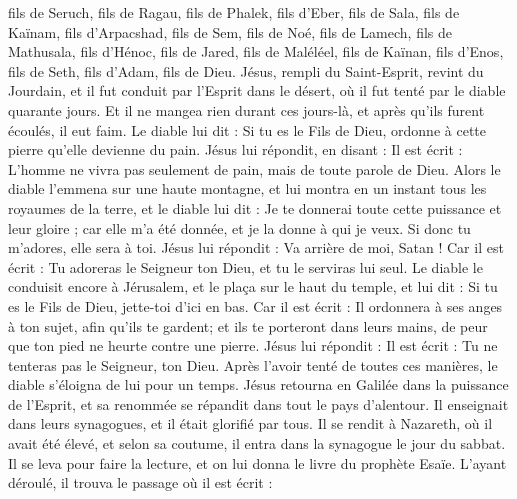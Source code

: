 \begin{multicols}{2}
fils de Seruch, fils de Ragau, fils de Phalek, fils d'Eber, fils de Sala,
fils de Kaïnam, fils d’Arpacshad, fils de Sem, fils de Noé, fils de Lamech,
fils de Mathusala, fils d'Hénoc, fils de Jared, fils de Maléléel, fils de Kaïnan,
fils d'Enos, fils de Seth, fils d'Adam, fils de Dieu.
\VerseOne{}Jésus, rempli du Saint-Esprit, revint du Jourdain, et il fut conduit par l'Esprit dans le désert,
où il fut tenté par le diable quarante jours. Et il ne mangea rien durant ces jours-là, et après qu'ils furent écoulés, il eut faim.
Le diable lui dit : Si tu es le Fils de Dieu, ordonne à cette pierre qu'elle devienne du pain.
Jésus lui répondit, en disant : Il est écrit : L’homme ne vivra pas seulement de pain, mais de toute parole de Dieu.
Alors le diable l'emmena sur une haute montagne, et lui montra en un instant tous les royaumes de la terre,
et le diable lui dit : Je te donnerai toute cette puissance et leur gloire ; car elle m'a été donnée, et je la donne à qui je veux.
Si donc tu m’adores, elle sera à toi.
Jésus lui répondit : Va arrière de moi, Satan ! Car il est écrit : Tu adoreras le Seigneur ton Dieu, et tu le serviras lui seul.
Le diable le conduisit encore à Jérusalem, et le plaça sur le haut du temple, et lui dit : Si tu es le Fils de Dieu, jette-toi d'ici en bas.
Car il est écrit : Il ordonnera à ses anges à ton sujet, afin qu’ils te gardent;
et ils te porteront dans leurs mains, de peur que ton pied ne heurte contre une pierre.
Jésus lui répondit : Il est écrit : Tu ne tenteras pas le Seigneur, ton Dieu.
Après l’avoir tenté de toutes ces manières, le diable s’éloigna de lui pour un temps.
Jésus retourna en Galilée dans la puissance de l'Esprit, et sa renommée se répandit dans tout le pays d'alentour.
Il enseignait dans leurs synagogues, et il était glorifié par tous.
Il se rendit à Nazareth, où il avait été élevé, et selon sa coutume, il entra dans la synagogue le jour du sabbat. Il se leva pour faire la lecture,
et on lui donna le livre du prophète Esaïe. L’ayant déroulé, il trouva le passage où il est écrit :

\end{multicols}
